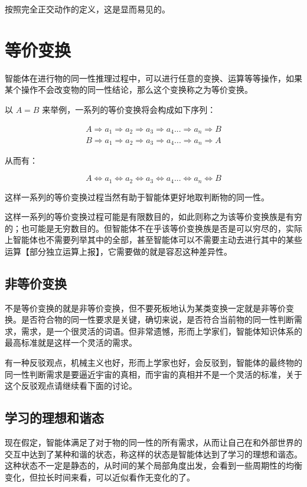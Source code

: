 \documentclass[12pt,oneside]{book}
\begin{document}
按照完全正交动作的定义，这是显而易见的。


\section{等价变换}
智能体在进行物的同一性推理过程中，可以进行任意的变换、运算等等操作，如果某个操作不会改变物的同一性结论，那么这个变换称之为等价变换。

以 $A=B$ 来举例，一系列的等价变换将会构成如下序列：

\begin{align*}
A \Rightarrow a_1 \Rightarrow a_2 \Rightarrow a_3 \Rightarrow a_4 ... \Rightarrow a_n \Rightarrow B \\
B \Rightarrow a_1 \Rightarrow a_2 \Rightarrow a_3 \Rightarrow a_4 ... \Rightarrow a_n \Rightarrow A
\end{align*}

从而有：

\[
A \Leftrightarrow a_1 \Leftrightarrow a_2 \Leftrightarrow a_3 \Leftrightarrow a_4 ... \Leftrightarrow a_n \Leftrightarrow B 
\]

这样一系列的等价变换过程当然有助于智能体更好地取判断物的同一性。

这样一系列的等价变换过程可能是有限数目的，如此则称之为该等价变换族是有穷的；也可能是无穷数目的。但智能体不在乎该等价变换族是否是可以穷尽的，实际上智能体也不需要列举其中的全部，甚至智能体可以不需要主动去进行其中的某些运算【部分独立运算上报】，它需要做的就是容忍这种差异性。


\subsection{非等价变换}
不是等价变换的就是非等价变换，但不要死板地认为某类变换一定就是非等价变换。是否符合物的同一性要求是关键，确切来说，是否符合当前物的同一性判断需求，需求，是一个很灵活的词语。但非常遗憾，形而上学家们，智能体知识体系的最高标准就是这样一个灵活的需求。

有一种反驳观点，机械主义也好，形而上学家也好，会反驳到，智能体的最终物的同一性判断需求是要逼近宇宙的真相，而宇宙的真相并不是一个灵活的标准，关于这个反驳观点请继续看下面的讨论。

\subsection{学习的理想和谐态}
现在假定，智能体满足了对于物的同一性的所有需求，从而让自己在和外部世界的交互中达到了某种和谐的状态，称这样的状态是智能体达到了学习的理想和谐态。这种状态不一定是静态的，从时间的某个局部角度出发，会看到一些周期性的均衡变化，但拉长时间来看，可以近似看作无变化的了。
\end{document}
